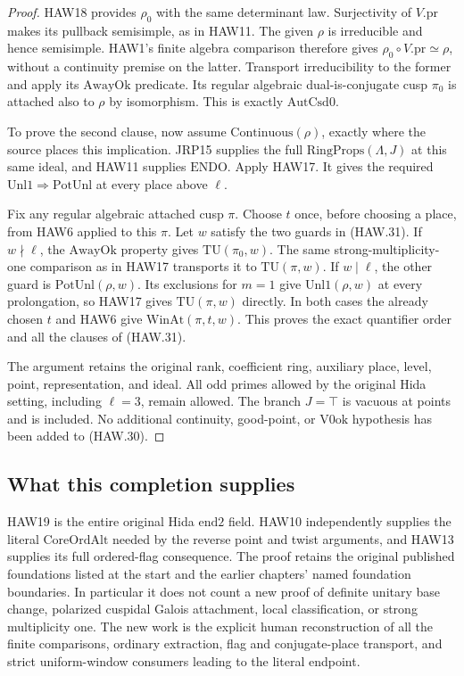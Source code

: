 \begin{proof}
HAW18 provides $\rho_0$ with the same determinant law.
Surjectivity of $V.\mathrm{pr}$ makes its pullback
semisimple, as in HAW11.  The given $\rho$ is irreducible
and hence semisimple.  HAW1's finite algebra comparison
therefore gives
$\rho_0\circ V.\mathrm{pr}\simeq\rho$, without a
continuity premise on the latter.  Transport irreducibility
to the former and apply its $\mathrm{AwayOk}$ predicate.
Its regular algebraic dual-is-conjugate cusp $\pi_0$ is
attached also to $\rho$ by isomorphism.  This is exactly
$\mathrm{AutCsd0}$.

To prove the second clause, now assume
$\mathrm{Continuous}(\rho)$, exactly where the source
places this implication.  JRP15 supplies the full
$\mathrm{RingProps}(\Lambda,J)$ at this same ideal, and
HAW11 supplies $\mathrm{ENDO}$.  Apply HAW17.  It gives
the required $\mathrm{Unl1}\Rightarrow\mathrm{PotUnl}$
at every place above $\ell$.

Fix any regular algebraic attached cusp $\pi$.  Choose
$t$ once, before choosing a place, from HAW6 applied to
this $\pi$.  Let $w$ satisfy the two guards in (HAW.31).
If $w\nmid\ell$, the $\mathrm{AwayOk}$ property gives
$\mathrm{TU}(\pi_0,w)$.  The same strong-multiplicity-one
comparison as in HAW17 transports it to
$\mathrm{TU}(\pi,w)$.  If $w\mid\ell$, the other guard
is $\mathrm{PotUnl}(\rho,w)$.  Its exclusions for $m=1$
give $\mathrm{Unl1}(\rho,w)$ at every prolongation, so
HAW17 gives $\mathrm{TU}(\pi,w)$ directly.  In both cases
the already chosen $t$ and HAW6 give
$\mathrm{WinAt}(\pi,t,w)$.  This proves the exact quantifier
order and all the clauses of (HAW.31).

The argument retains the original rank, coefficient ring,
auxiliary place, level, point, representation, and ideal.
All odd primes allowed by the original Hida setting,
including $\ell=3$, remain allowed.  The branch $J=\top$
is vacuous at points and is included.  No additional
continuity, good-point, or $\mathrm{V0ok}$ hypothesis has
been added to (HAW.30).
\end{proof}

\subsection{What this completion supplies}

HAW19 is the entire original Hida $\mathrm{end2}$ field.
HAW10 independently supplies the literal $\mathrm{CoreOrdAlt}$
needed by the reverse point and twist arguments, and HAW13
supplies its full ordered-flag consequence.  The proof retains
the original published foundations listed at the start and
the earlier chapters' named foundation boundaries.  In
particular it does not count a new proof of definite unitary
base change, polarized cuspidal Galois attachment, local
classification, or strong multiplicity one.  The new work
is the explicit human reconstruction of all the finite
comparisons, ordinary extraction, flag and conjugate-place
transport, and strict uniform-window consumers leading to
the literal endpoint.

